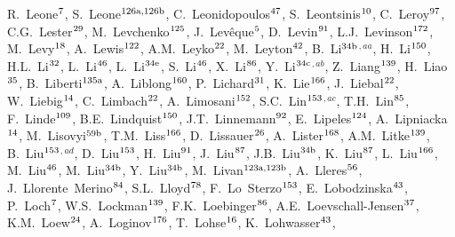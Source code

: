 \begin{flushleft}
R.~Leone$^\textrm{\scriptsize 7}$,
S.~Leone$^\textrm{\scriptsize 126a,126b}$,
C.~Leonidopoulos$^\textrm{\scriptsize 47}$,
S.~Leontsinis$^\textrm{\scriptsize 10}$,
C.~Leroy$^\textrm{\scriptsize 97}$,
C.G.~Lester$^\textrm{\scriptsize 29}$,
M.~Levchenko$^\textrm{\scriptsize 125}$,
J.~Lev\^eque$^\textrm{\scriptsize 5}$,
D.~Levin$^\textrm{\scriptsize 91}$,
L.J.~Levinson$^\textrm{\scriptsize 172}$,
M.~Levy$^\textrm{\scriptsize 18}$,
A.~Lewis$^\textrm{\scriptsize 122}$,
A.M.~Leyko$^\textrm{\scriptsize 22}$,
M.~Leyton$^\textrm{\scriptsize 42}$,
B.~Li$^\textrm{\scriptsize 34b}$$^{,aa}$,
H.~Li$^\textrm{\scriptsize 150}$,
H.L.~Li$^\textrm{\scriptsize 32}$,
L.~Li$^\textrm{\scriptsize 46}$,
L.~Li$^\textrm{\scriptsize 34e}$,
S.~Li$^\textrm{\scriptsize 46}$,
X.~Li$^\textrm{\scriptsize 86}$,
Y.~Li$^\textrm{\scriptsize 34c}$$^{,ab}$,
Z.~Liang$^\textrm{\scriptsize 139}$,
H.~Liao$^\textrm{\scriptsize 35}$,
B.~Liberti$^\textrm{\scriptsize 135a}$,
A.~Liblong$^\textrm{\scriptsize 160}$,
P.~Lichard$^\textrm{\scriptsize 31}$,
K.~Lie$^\textrm{\scriptsize 166}$,
J.~Liebal$^\textrm{\scriptsize 22}$,
W.~Liebig$^\textrm{\scriptsize 14}$,
C.~Limbach$^\textrm{\scriptsize 22}$,
A.~Limosani$^\textrm{\scriptsize 152}$,
S.C.~Lin$^\textrm{\scriptsize 153}$$^{,ac}$,
T.H.~Lin$^\textrm{\scriptsize 85}$,
F.~Linde$^\textrm{\scriptsize 109}$,
B.E.~Lindquist$^\textrm{\scriptsize 150}$,
J.T.~Linnemann$^\textrm{\scriptsize 92}$,
E.~Lipeles$^\textrm{\scriptsize 124}$,
A.~Lipniacka$^\textrm{\scriptsize 14}$,
M.~Lisovyi$^\textrm{\scriptsize 59b}$,
T.M.~Liss$^\textrm{\scriptsize 166}$,
D.~Lissauer$^\textrm{\scriptsize 26}$,
A.~Lister$^\textrm{\scriptsize 168}$,
A.M.~Litke$^\textrm{\scriptsize 139}$,
B.~Liu$^\textrm{\scriptsize 153}$$^{,ad}$,
D.~Liu$^\textrm{\scriptsize 153}$,
H.~Liu$^\textrm{\scriptsize 91}$,
J.~Liu$^\textrm{\scriptsize 87}$,
J.B.~Liu$^\textrm{\scriptsize 34b}$,
K.~Liu$^\textrm{\scriptsize 87}$,
L.~Liu$^\textrm{\scriptsize 166}$,
M.~Liu$^\textrm{\scriptsize 46}$,
M.~Liu$^\textrm{\scriptsize 34b}$,
Y.~Liu$^\textrm{\scriptsize 34b}$,
M.~Livan$^\textrm{\scriptsize 123a,123b}$,
A.~Lleres$^\textrm{\scriptsize 56}$,
J.~Llorente~Merino$^\textrm{\scriptsize 84}$,
S.L.~Lloyd$^\textrm{\scriptsize 78}$,
F.~Lo~Sterzo$^\textrm{\scriptsize 153}$,
E.~Lobodzinska$^\textrm{\scriptsize 43}$,
P.~Loch$^\textrm{\scriptsize 7}$,
W.S.~Lockman$^\textrm{\scriptsize 139}$,
F.K.~Loebinger$^\textrm{\scriptsize 86}$,
A.E.~Loevschall-Jensen$^\textrm{\scriptsize 37}$,
K.M.~Loew$^\textrm{\scriptsize 24}$,
A.~Loginov$^\textrm{\scriptsize 176}$,
T.~Lohse$^\textrm{\scriptsize 16}$,
K.~Lohwasser$^\textrm{\scriptsize 43}$,

\end{flushleft}

